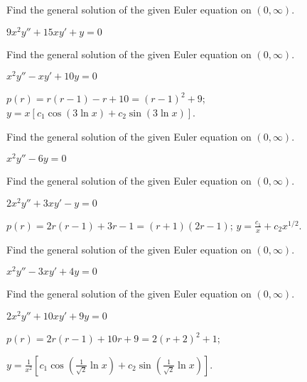 \documentclass{ximera}
\begin{document}
\begin{problem}\label{exer:7.4.13} 
Find the general solution of
the given Euler equation on $(0,\infty)$.

$9x^2y''+15xy'+y=0$
\end{problem}

\begin{problem}\label{exer:7.4.14}
Find the general solution of
the given Euler equation on $(0,\infty)$.

$x^2y''-xy'+10y=0$

\begin{solution}
    $p(r)=r(r-1)-r+10=(r-1)^2+9$;
 $y=x\left[c_1\cos(3 \ln x)+c_2\sin(3 \ln x)\right]$.
\end{solution}
\end{problem}

\begin{problem}\label{exer:7.4.15} 
Find the general solution of
the given Euler equation on $(0,\infty)$.

$x^2y''-6y=0$
\end{problem}

\begin{problem}\label{exer:7.4.16}
Find the general solution of
the given Euler equation on $(0,\infty)$.

$2x^2y''+3xy'-y=0$

\begin{solution}
    $p(r)=2r(r-1)+3r-1=(r+1)(2r-1)$;
$y=\frac{c_1}{ x}+c_2 x^{1/2}$.
\end{solution}
\end{problem}


\begin{problem}\label{exer:7.4.17} 
Find the general solution of
the given Euler equation on $(0,\infty)$.

$x^2y''-3xy'+4y=0$
\end{problem}

\begin{problem}\label{exer:7.4.18}
Find the general solution of
the given Euler equation on $(0,\infty)$.

$2x^2y''+10xy'+9y=0$

\begin{solution}
    $p(r)=2r(r-1)+10r+9=2(r+2)^2+1$;
    
$y=\frac{1}{ x^2}
\left[c_1\cos\left(\frac{1}{\sqrt{2}} \ln x\right)+c_2\sin
\left(\frac{1}{\sqrt{2}} \ln x\right) \right]$.
\end{solution}
\end{problem}
\end{document}
